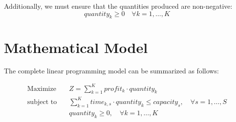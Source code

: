 \documentclass{article}
\begin{document}
Additionally, we must ensure that the quantities produced are non-negative:
\[
quantity_k \geq 0 \quad \forall k = 1, \ldots, K
\]

\section*{Mathematical Model}
The complete linear programming model can be summarized as follows:

\begin{align*}
\text{Maximize} \quad & Z = \sum_{k=1}^{K} profit_k \cdot quantity_k \\
\text{subject to} \quad & \sum_{k=1}^{K} time_{k, s} \cdot quantity_k \leq capacity_s, \quad \forall s = 1, \ldots, S \\
& quantity_k \geq 0, \quad \forall k = 1, \ldots, K 
\end{align*}
\end{document}
